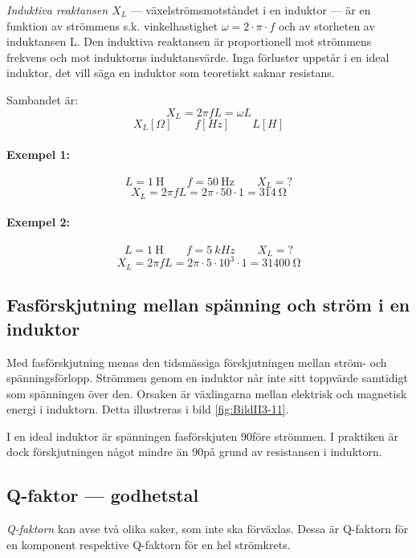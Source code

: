 \emph{Induktiva reaktansen \(X_L\)} --- växelströmsmotståndet i en induktor ---
är en funktion av strömmens s.k. vinkelhastighet \(\omega = 2 \cdot \pi \cdot
f\) och av storheten av induktansen L.
Den induktiva reaktansen är proportionell mot strömmens frekvens och mot
induktorns induktansvärde. Inga förluster uppstår i en ideal induktor, det vill
säga en induktor som teoretiskt saknar resistans.

Sambandet är:
\[ X_L = 2\pi fL = \omega L\]
\[ X_L \unit{[\Omega]} \qquad f \unit{[Hz]} \qquad L \unit{[H]} \]

\noindent\paragraph{Exempel 1:}
\[ L = \SI{1}{\henry} \qquad f = \SI{50}{\hertz} \qquad X_L = ? \]
\[ X_L = 2\pi fL = 2\pi  \cdot 50 \cdot 1 = \SI{314}{\ohm}  \]

\noindent\paragraph{Exempel 2:}
\[ L = \SI{1}{\henry} \qquad f = \SI{5}{kHz} \qquad X_L = ? \]
\[ X_L = 2\pi fL = 2\pi  \cdot 5 \cdot 10^3 \cdot 1 = \SI{31400}{\ohm} \]

\subsection{Fasförskjutning mellan spänning och ström i en induktor}

Med fasförskjutning menas den tidsmässiga förskjutningen mellan ström- och
spänningsförlopp. Strömmen genom en induktor når inte sitt toppvärde samtidigt
som spänningen över den. Orsaken är växlingarna mellan elektrisk och magnetisk
energi i induktorn. Detta illustreras i bild \ref{fig:BildII3-11}.

I en ideal induktor är spänningen fasförskjuten 90\degree före strömmen. I
praktiken är dock förskjutningen något mindre än 90\degree på grund av
resistansen i induktorn.

\subsection{Q-faktor --- godhetstal}

\emph{Q-faktorn} kan avse två olika saker, som inte ska förväxlas.
Dessa är Q-faktorn för en komponent respektive Q-faktorn för en hel strömkrets.


